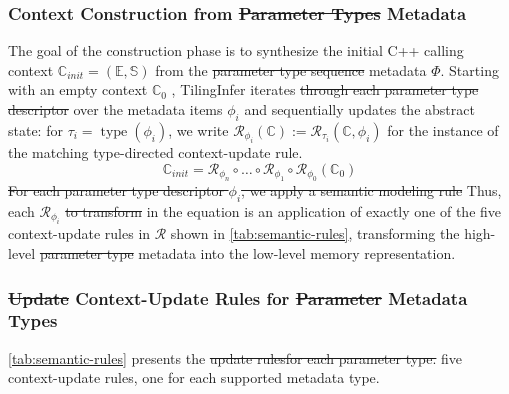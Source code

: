 \documentclass[manuscript,screen,review]{acmart}
\theoremstyle{indenteditalic}
\providecommand{\DIFaddtex}[1]{{\protect\color{blue}#1}} %
\providecommand{\DIFidentity}[1]{#1}
\providecommand{\DIFdeltex}[1]{{%
  \protect\color{red}%
  \normalfont\normalsize
  \let\textbf\DIFidentity
  \let\textit\DIFidentity
  \let\texttt\DIFidentity
  \let\textsc\DIFidentity
  \let\textsf\DIFidentity
  \let\emph\DIFidentity
  \let\uline\DIFidentity
  \sout{#1}%
}} %
\providecommand{\DIFaddbegin}{} %
\providecommand{\DIFaddend}{} %
\providecommand{\DIFdelbegin}{} %
\providecommand{\DIFdelend}{} %
\providecommand{\DIFadd}[1]{\texorpdfstring{\DIFaddtex{#1}}{#1}} %
\providecommand{\DIFdel}[1]{\texorpdfstring{\DIFdeltex{#1}}{}} %
\begin{document}
\subsubsection{Context Construction from \DIFdelbegin \DIFdel{Parameter Types}\DIFdelend \DIFaddbegin \DIFadd{Metadata}\DIFaddend }\label{sec:design:update}

The goal of the construction phase is to synthesize the initial C++ calling context $\mathbb{C}_{init} = (\mathbb{E}, \mathbb{S})$ from the \DIFdelbegin \DIFdel{parameter type sequence }\DIFdelend \DIFaddbegin \DIFadd{metadata }\DIFaddend $\Phi$.
Starting with an empty context $\mathbb{C}_{0}$ , TilingInfer iterates \DIFdelbegin \DIFdel{through each parameter type descriptor }\DIFdelend \DIFaddbegin \DIFadd{over the metadata items }\DIFaddend $\phi_i$ and sequentially updates  the abstract state:
\DIFaddbegin \DIFadd{for $\tau_i = \operatorname{type}(\phi_i)$, we write $\mathcal{R}_{\phi_i}(\mathbb{C}) := \mathcal{R}_{\tau_i}(\mathbb{C}, \phi_i)$ for the instance of the matching type-directed context-update rule.
}\DIFaddend \begin{equation}
	\mathbb{C}_{init} = \mathcal{R}_{\phi_n} \circ \dots \circ \mathcal{R}_{\phi_1} \circ \mathcal{R}_{\phi_0} (\mathbb{C}_0)
\end{equation}
\DIFdelbegin \DIFdel{For each parameter type descriptor $\phi_i$, we apply a semantic modeling rule}\DIFdelend \DIFaddbegin \DIFadd{Thus, each }\DIFaddend $\mathcal{R}_{\phi_i}$ \DIFdelbegin %
\DIFdel{to transform }\DIFdelend \DIFaddbegin \DIFadd{in the equation is an application of exactly one of the five context-update rules in $\mathcal{R}$ shown in }\autoref{tab:semantic-rules}\DIFadd{, transforming }\DIFaddend the high-level \DIFdelbegin \DIFdel{parameter type }\DIFdelend \DIFaddbegin \DIFadd{metadata }\DIFaddend into the low-level memory representation.

\subsubsection{\DIFdelbegin \DIFdel{Update }\DIFdelend \DIFaddbegin \DIFadd{Context-Update }\DIFaddend Rules for \DIFdelbegin \DIFdel{Parameter }\DIFdelend \DIFaddbegin \DIFadd{Metadata }\DIFaddend Types}\label{sec:design:rules}

\autoref{tab:semantic-rules} presents the \DIFdelbegin \DIFdel{update rulesfor each parameter type.
}\DIFdelend \DIFaddbegin \DIFadd{five context-update rules, one for each supported metadata type.
}
\end{document}
